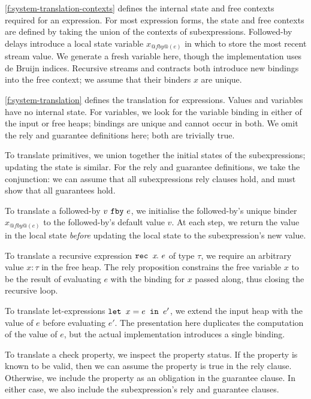 

\autoref{f:system-translation-contexts} defines the internal state and free contexts required for an expression.
For most expression forms, the state and free contexts are defined by taking the union of the contexts of subexpressions.
Followed-by delays introduce a local state variable $x_{@fby@(e)}$ in which to store the most recent stream value.
We generate a fresh variable here, though the implementation uses de Bruijn indices.
Recursive streams and contracts both introduce new bindings into the free context; we assume that their binders $x$ are unique.

\autoref{f:system-translation} defines the translation for expressions.
Values and variables have no internal state.
For variables, we look for the variable binding in either of the input or free heaps; bindings are unique and cannot occur in both.
We omit the rely and guarantee definitions here; both are trivially true.

To translate primitives, we union together the initial states of the subexpressions; updating the state is similar.
For the rely and guarantee definitions, we take the conjunction: we can assume that all subexpressions rely clauses hold, and must show that all guarantees hold.

To translate a followed-by $v~\texttt{fby}~e$, we initialise the followed-by's unique binder $x_{@fby@(e)}$ to the followed-by's default value $v$.
At each step, we return the value in the local state \emph{before} updating the local state to the subexpression's new value.

To translate a recursive expression $\texttt{rec~} x\hspace{-0.1em}.~e$ of type $\tau$, we require an arbitrary value $x: \tau$ in the free heap.
The rely proposition constrains the free variable $x$ to be the result of evaluating $e$ with the binding for $x$ passed along, thus closing the recursive loop.

To translate let-expressions $\texttt{let~} x = e \texttt{~in~} e'$, we extend the input heap with the value of $e$ before evaluating $e'$.
The presentation here duplicates the computation of the value of $e$, but the actual implementation introduces a single binding.

To translate a check property, we inspect the property status.
If the property is known to be valid, then we can assume the property is true in the rely clause.
Otherwise, we include the property as an obligation in the guarantee clause.
In either case, we also include the subexpression's rely and guarantee clauses.

